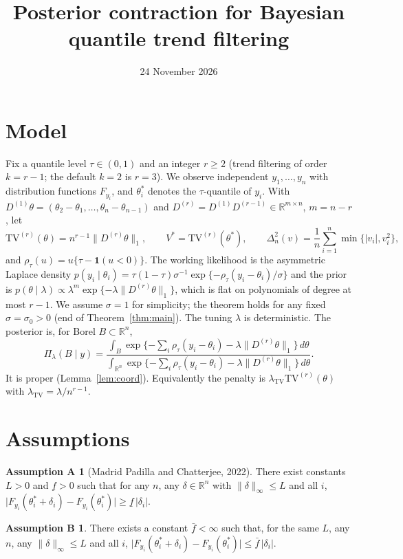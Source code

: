 \documentclass[11pt]{article}
\title{Posterior contraction for Bayesian quantile trend filtering}
\author{}
\date{24 November 2026}
\theoremstyle{definition}
\newtheorem*{assumptionA}{Assumption A}
\newtheorem*{assumptionB}{Assumption B}
\theoremstyle{remark}
\newcommand{\R}{\mathbb{R}}
\newcommand{\TV}{\mathrm{TV}}
\newcommand{\Dr}{D^{(r)}}
\newcommand{\lamtv}{\lambda_{\TV}}
\newcommand{\thetas}{\theta^{*}}
\newcommand{\fl}{\underline f}
\newcommand{\fu}{\bar f}
\newcommand{\ind}{\mathbf 1}
\begin{document}
\maketitle
\vspace{-2em}

\section{Model}

Fix a quantile level $\tau\in(0,1)$ and an integer $r\ge2$ (trend filtering of order $k=r-1$; the default $k=2$ is $r=3$). We observe independent $y_1,\dots,y_n$ with distribution functions $F_{y_i}$, and $\thetas_i$ denotes the $\tau$-quantile of $y_i$. With $D^{(1)}\theta=(\theta_2-\theta_1,\dots,\theta_n-\theta_{n-1})$ and $\Dr=D^{(1)}D^{(r-1)}\in\R^{m\times n}$, $m=n-r$, let
\[
\TV^{(r)}(\theta)=n^{r-1}\|\Dr\theta\|_1,\qquad V^{*}=\TV^{(r)}(\thetas),\qquad
\Delta_n^2(v)=\frac1n\sum_{i=1}^n\min\{|v_i|,v_i^2\},
\]
and $\rho_\tau(u)=u\{\tau-\ind(u<0)\}$. The working likelihood is the asymmetric Laplace density $p(y_i\mid\theta_i)=\tau(1-\tau)\sigma^{-1}\exp\{-\rho_\tau(y_i-\theta_i)/\sigma\}$ and the prior is $p(\theta\mid\lambda)\propto\lambda^m\exp\{-\lambda\|\Dr\theta\|_1\}$, which is flat on polynomials of degree at most $r-1$. We assume $\sigma=1$ for simplicity; the theorem holds for any fixed $\sigma=\sigma_0>0$ (end of Theorem~\ref{thm:main}). The tuning $\lambda$ is deterministic. The posterior is, for Borel $B\subset\R^n$,
\begin{equation}\label{eq:post}
\Pi_\lambda(B\mid y)=\frac{\int_B\exp\{-\sum_{i}\rho_\tau(y_i-\theta_i)-\lambda\|\Dr\theta\|_1\}\,d\theta}
{\int_{\R^n}\exp\{-\sum_{i}\rho_\tau(y_i-\theta_i)-\lambda\|\Dr\theta\|_1\}\,d\theta}.
\end{equation}
It is proper (Lemma~\ref{lem:coord}). Equivalently the penalty is $\lamtv\TV^{(r)}(\theta)$ with $\lamtv=\lambda/n^{r-1}$.

\section{Assumptions}

\begin{assumptionA}[Madrid Padilla and Chatterjee, 2022]
There exist constants $L>0$ and $\fl>0$ such that for any $n$, any $\delta\in\R^n$ with $\|\delta\|_\infty\le L$ and all $i$,
$\bigl|F_{y_i}(\thetas_i+\delta_i)-F_{y_i}(\thetas_i)\bigr|\ge\fl\,|\delta_i|$.
\end{assumptionA}
\begin{assumptionB}
There exists a constant $\fu<\infty$ such that, for the same $L$, any $n$, any $\|\delta\|_\infty\le L$ and all $i$,
$\bigl|F_{y_i}(\thetas_i+\delta_i)-F_{y_i}(\thetas_i)\bigr|\le\fu\,|\delta_i|$.
\end{assumptionB}
\end{document}
